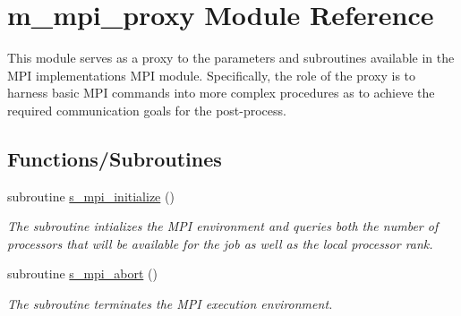 \hypertarget{namespacem__mpi__proxy}{}\section{m\+\_\+mpi\+\_\+proxy Module Reference}
\label{namespacem__mpi__proxy}


This module serves as a proxy to the parameters and subroutines available in the M\+PI implementation\textquotesingle{}s M\+PI module. Specifically, the role of the proxy is to harness basic M\+PI commands into more complex procedures as to achieve the required communication goals for the post-\/process.  


\subsection*{Functions/\+Subroutines}
\begin{DoxyCompactItemize}
\item 
subroutine \hyperlink{namespacem__mpi__proxy_a9bc4c617505152d3cc553e5bc25c1ee1}{s\+\_\+mpi\+\_\+initialize} ()
\begin{DoxyCompactList}\small\item\em The subroutine intializes the M\+PI environment and queries both the number of processors that will be available for the job as well as the local processor rank. \end{DoxyCompactList}\item 
subroutine \hyperlink{namespacem__mpi__proxy_a04ac565bad2b22dc045a5eeb4f516e2e}{s\+\_\+mpi\+\_\+abort} ()
\begin{DoxyCompactList}\small\item\em The subroutine terminates the M\+PI execution environment. \end{DoxyCompactList}\end{DoxyCompactItemize}

